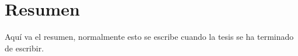 \chapter*{Resumen}
Aquí va el resumen, normalmente esto se escribe cuando la tesis se ha terminado de escribir.
